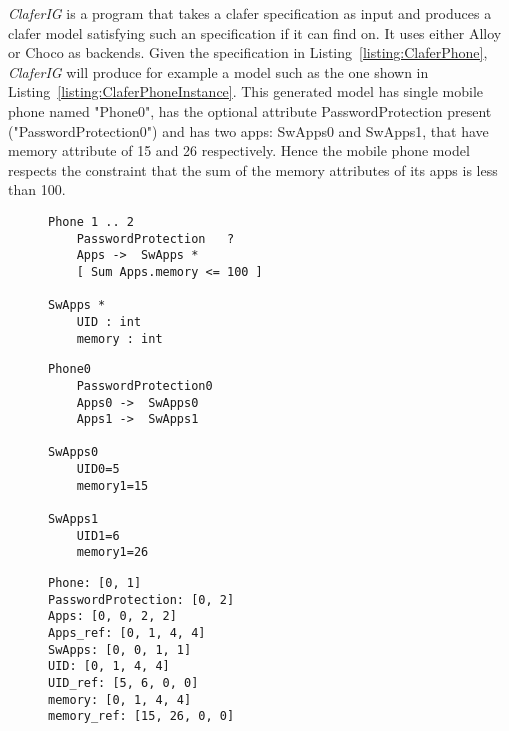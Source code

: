 \documentclass{article}
\newcommand{\listref}[1]{Listing~\ref{#1}}
\begin{document}
\emph{ClaferIG}  is a program that takes a clafer specification as input and produces a clafer model satisfying such an specification if it can find on. It uses either Alloy or Choco as backends. Given the specification in  \listref{listing:ClaferPhone}, \emph{ClaferIG}   will produce for example a model such as the one shown in \listref{listing:ClaferPhoneInstance}.  This generated model has single mobile phone named "Phone0", has the optional attribute PasswordProtection present ("PasswordProtection0") and has two apps: SwApps0 and SwApps1, that have memory attribute of 15 and 26 respectively. Hence the mobile phone model respects the constraint that the sum of the memory attributes of its apps is less than 100. 
\begin{figure}[!t]
\par\noindent
\begin{minipage}[t]{.32\textwidth}
\begin{lstlisting}[language=clafer, caption=A specification of a mobile phone and its apps in clafer., label={listing:ClaferPhone}]
Phone 1 .. 2
	PasswordProtection 	 ?
	Apps ->  SwApps *
	[ Sum Apps.memory <= 100 ]
	
SwApps * 
	UID : int
	memory : int
\end{lstlisting}%
\end{minipage}%
\hfill
\begin{minipage}[t]{.32\textwidth}
\begin{lstlisting}[language=clafer, caption=A generated model of a mobile phone and its apps in clafer from the specification in Listing 1., label={listing:ClaferPhoneInstance}]
Phone0
	PasswordProtection0
	Apps0 ->  SwApps0
	Apps1 ->  SwApps1
	
SwApps0 
	UID0=5
	memory1=15

SwApps1 
	UID1=6
	memory1=26
\end{lstlisting}%
\end{minipage}%
\hfill
\begin{minipage}[t]{.32\textwidth}
\begin{lstlisting}[language=clafer, caption=The integer variables associated with each clafer in Z3 and corresponding to Listing 2., label={listing:ClaferPhoneZ3}]
Phone: [0, 1]
PasswordProtection: [0, 2]
Apps: [0, 0, 2, 2]
Apps_ref: [0, 1, 4, 4]
SwApps: [0, 0, 1, 1]
UID: [0, 1, 4, 4]
UID_ref: [5, 6, 0, 0]
memory: [0, 1, 4, 4]
memory_ref: [15, 26, 0, 0]
\end{lstlisting}%
\end{minipage}%
\end{figure}
\end{document}
